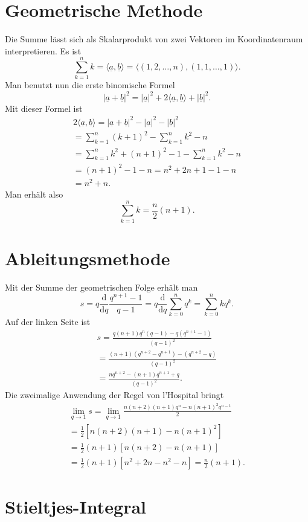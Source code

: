 \documentclass[a4paper,10pt,fleqn,twocolumn,twoside]{article}
\begin{document}
\section{Geometrische Methode}

Die Summe lässt sich als Skalarprodukt von zwei Vektoren im Koordinatenraum interpretieren. Es ist
\[\sum_{k=1}^n k = \langle \underline a,\underline b\rangle
= \langle (1,2,\ldots,n),(1,1,\ldots,1)\rangle.\]
Man benutzt nun die erste binomische Formel
\[|\underline a+\underline b|^2
= |\underline a|^2+2\langle\underline a,\underline b\rangle
+|\underline b|^2.\]
Mit dieser Formel ist
\begin{gather*}
2\langle\underline a,\underline b\rangle
= |\underline a+\underline b|^2-|\underline a|^2-|\underline b|^2\\
= \sum_{k=1}^n (k+1)^2-\sum_{k=1}^n k^2-n\\
= \sum_{k=1}^n k^2+(n+1)^2-1-\sum_{k=1}^n k^2-n\\
= (n+1)^2-1-n = n^2+2n+1-1-n\\
= n^2+n.
\end{gather*}
Man erhält also
\[\sum_{k=1}^n k = \frac{n}{2}(n+1).\]

\section{Ableitungsmethode}

Mit der Summe der geometrischen Folge erhält man
\[s=q\frac{\mathrm d}{\mathrm dq} \frac{q^{n+1}-1}{q-1}
= q\frac{\mathrm d}{\mathrm dq}
\sum_{k=0}^n q^k = \sum_{k=0}^n kq^k.\]
Auf der linken Seite ist
\begin{gather*}
s=\frac{q(n+1)q^n(q-1)-q(q^{n+1}-1)}{(q-1)^2}\\
= \frac{(n+1)(q^{n+2}-q^{n+1})-(q^{n+2}-q)}{(q-1)^2}\\
= \frac{nq^{n+2}-(n+1)q^{n+1}+q}{(q-1)^2}.
\end{gather*}
Die zweimalige Anwendung der Regel von l'Hospital bringt
\begin{gather*}
\lim_{q\rightarrow 1}s = \lim_{q\rightarrow 1}
\frac{n(n+2)(n+1)q^n-n(n+1)^2q^{n-1}}{2}\\
= \frac{1}{2}[n(n+2)(n+1)-n(n+1)^2]\\
= \frac{1}{2}(n+1)[n(n+2)-n(n+1)]\\
= \frac{1}{2}(n+1)[n^2+2n-n^2-n]
= \frac{n}{2}(n+1).
\end{gather*}



\section{Stieltjes-Integral}
\end{document}
